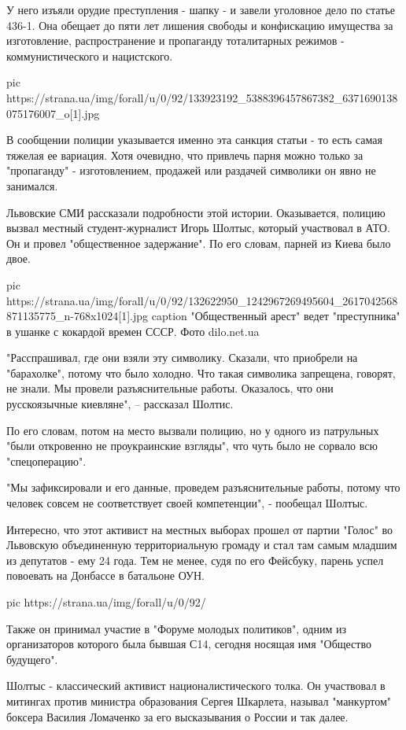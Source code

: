 У него изъяли орудие преступления - шапку - и завели уголовное дело по статье
436-1. Она обещает до пяти лет лишения свободы и конфискацию имущества за
изготовление, распространение и пропаганду тоталитарных режимов -
коммунистического и нацистского. 

\ifcmt
  pic https://strana.ua/img/forall/u/0/92/133923192_5388396457867382_6371690138075176007_o[1].jpg
\fi

В сообщении полиции указывается именно эта санкция статьи - то есть самая
тяжелая ее вариация. Хотя очевидно, что привлечь парня можно только за
"пропаганду" - изготовлением, продажей или раздачей символики он явно не
занимался. 

Львовские СМИ рассказали подробности этой истории. Оказывается, полицию вызвал
местный студент-журналист Игорь Шолтыс, который участвовал в АТО. Он и провел
"общественное задержание". По его словам, парней из Киева было двое. 

\ifcmt
  pic https://strana.ua/img/forall/u/0/92/132622950_1242967269495604_2617042568871135775_n-768x1024[1].jpg
	caption "Общественный арест" ведет "преступника" в ушанке с кокардой времен СССР. Фото dilo.net.ua 
\fi

"Расспрашивал, где они взяли эту символику. Сказали, что приобрели на
"барахолке", потому что было холодно. Что такая символика запрещена, говорят,
не знали. Мы провели разъяснительные работы. Оказалось, что они русскоязычные
киевляне", – рассказал Шолтис.

По его словам, потом на место вызвали полицию, но у одного из патрульных "были
откровенно не проукраинские взгляды", что чуть было не сорвало всю
"спецоперацию".

"Мы зафиксировали и его данные, проведем разъяснительные работы, потому что
человек совсем не соответствует своей компетенции", - пообещал Шолтыс. 

Интересно, что этот активист на местных выборах прошел от партии "Голос" во
Львовскую объединенную территориальную громаду и стал там самым младшим из
депутатов - ему 24 года. Тем не менее, судя по его Фейсбуку, парень успел
повоевать на Донбассе в батальоне ОУН.  

\ifcmt
  pic https://strana.ua/img/forall/u/0/92/%
\fi

Также он принимал участие в "Форуме молодых политиков", одним из организаторов
которого была бывшая С14, сегодня носящая имя "Общество будущего". 

Шолтыс - классический активист националистического толка. Он участвовал в
митингах против министра образования Сергея Шкарлета, называл "манкуртом"
боксера Василия Ломаченко за его высказывания о России и так далее. 

